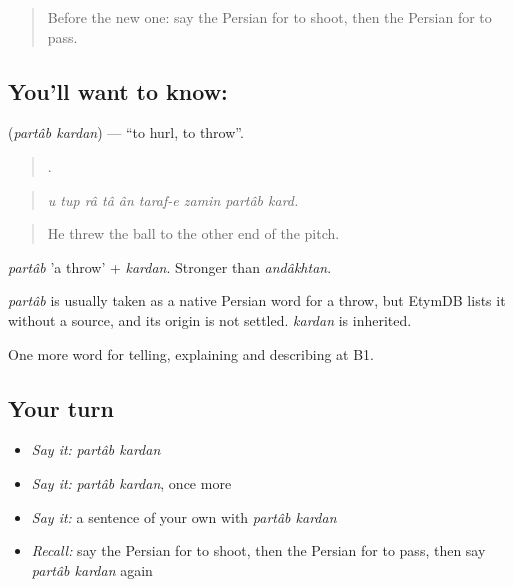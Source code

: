 \label{lesson:FA-C515-partab-kardan}



\begin{quote}
Before the new one: say the Persian for to shoot, then the Persian for to pass.
\end{quote}

\subsection*{You'll want to know:  }
\textbf{ } (\emph{partâb kardan}) — \textquotedblleft{}to hurl, to throw\textquotedblright{}.

\begin{quote}
        .
\end{quote}

\begin{quote}
\emph{u tup râ tâ ân taraf-e zamin partâb kard.}
\end{quote}

\begin{quote}
He threw the ball to the other end of the pitch.
\end{quote}

\emph{partâb} 'a throw' + \emph{kardan}. Stronger than \emph{andâkhtan}.

\begin{cousinweb}
\emph{partâb} is usually taken as a native Persian word for a throw, but EtymDB lists it without a source, and its origin is not settled. \emph{kardan} is inherited.
\end{cousinweb}

\begin{grammarlens}[title={What you've built}]
One more word for telling, explaining and describing at B1.
\end{grammarlens}

\subsection*{Your turn}
\begin{itemize}
\raggedright
  \item \emph{Say it:} \emph{partâb kardan}
  \item \emph{Say it:} \emph{partâb kardan}, once more
  \item \emph{Say it:} a sentence of your own with \emph{partâb kardan}
  \item \emph{Recall:} say the Persian for to shoot, then the Persian for to pass, then say \emph{partâb kardan} again
\end{itemize}

